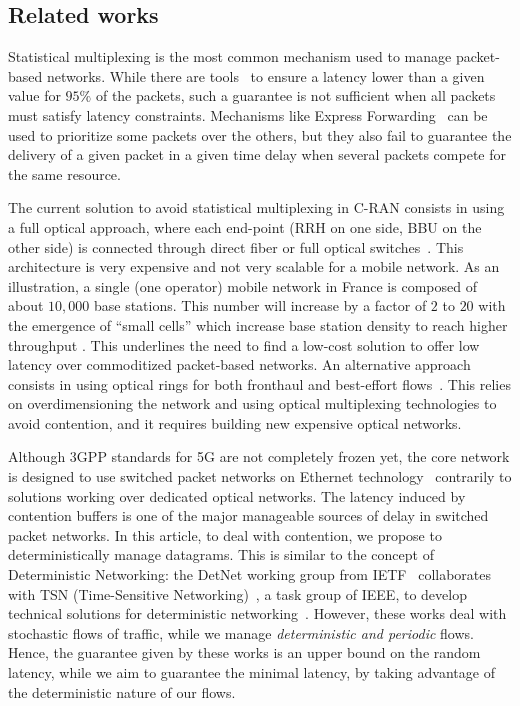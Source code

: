 \documentclass[a4paper,10pt]{journal}
\begin{document}
 \subsection*{Related works}

Statistical multiplexing is the most common mechanism used to manage packet-based networks. While there are tools~\cite{metricsietf} to ensure a latency lower than a given value for $95\%$ of the packets, such a guarantee is not sufficient when all packets must satisfy latency constraints. Mechanisms like Express Forwarding~\cite{exprforw} can be used to prioritize some packets over the others, but they also fail to guarantee the delivery of a given packet in a given time delay when several packets compete for the same resource. 

The current solution to avoid statistical multiplexing in C-RAN consists in using a full optical approach, where each end-point (RRH on one side, BBU on the other side) is connected through direct fiber or full optical switches~\cite{kai2020amplify,tayq2017real}. This architecture is very expensive and not very scalable for a mobile network. As an illustration, a single (one operator) mobile network in France is composed of about $10,000$ base stations. This number will increase by a factor of $2$ to $20$ with the emergence of “small cells” which increase base station density to reach higher throughput \cite{dahlman20185g,romano2019imt}. This underlines the need to find a low-cost solution to offer low latency over commoditized packet-based networks. 
An alternative approach consists in using optical rings for both fronthaul and best-effort flows~\cite{DBLP:conf/ondm/BarthGS19,rommel2020towards,luu2021dynamic}. This relies on overdimensioning the network and using optical multiplexing technologies to avoid contention, and it requires building new expensive optical networks.

Although 3GPP standards for 5G are not completely frozen yet, the core network is designed to use switched packet networks on Ethernet technology~\cite{ieee1914,gomes2015fronthaul}
contrarily to solutions working over dedicated optical networks. The latency induced by contention buffers is one of the major manageable sources of delay in switched packet networks. In this article, to deal with contention, we propose to deterministically manage datagrams. This is similar to the concept of Deterministic Networking: the DetNet working group from IETF~\cite{finn-detnet-architecture-08} collaborates with TSN (Time-Sensitive Networking)~\cite{ieee802}, a task group of IEEE, to develop technical solutions for deterministic networking~\cite{bhattacharjee2020time,8613095,durr2016no}. However, these works deal with stochastic flows of traffic, while we manage \emph{deterministic and periodic} flows. Hence, the guarantee given by these works is an upper bound on the random latency, while we aim to guarantee the minimal latency, by taking advantage of the deterministic nature of our flows. 
\end{document}
